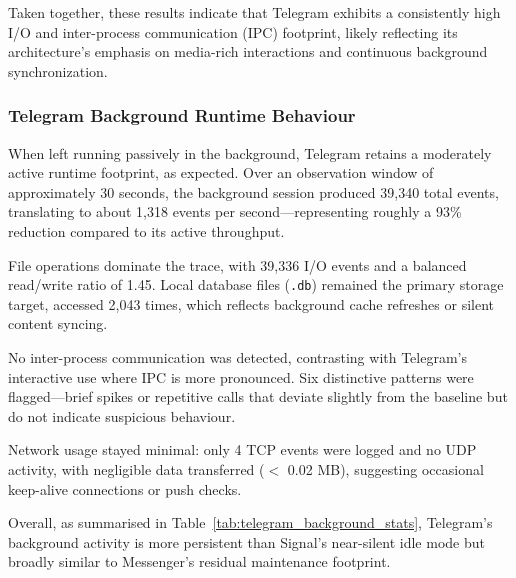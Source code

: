 \documentclass[a4paper,12pt]{report}
\begin{document}
Taken together, these results indicate that Telegram exhibits a consistently high I/O and inter-process communication (IPC) footprint, likely reflecting its architecture’s emphasis on media-rich interactions and continuous background synchronization.
\subsubsection{Telegram Background Runtime Behaviour}

When left running passively in the background, Telegram retains a moderately active runtime footprint, as expected. Over an observation window of approximately 30 seconds, the background session produced 39,340 total events, translating to about 1,318 events per second—representing roughly a 93\% reduction compared to its active throughput.

File operations dominate the trace, with 39,336 I/O events and a balanced read/write ratio of 1.45. Local database files (\texttt{.db}) remained the primary storage target, accessed 2,043 times, which reflects background cache refreshes or silent content syncing.

No inter-process communication was detected, contrasting with Telegram’s interactive use where IPC is more pronounced. Six distinctive patterns were flagged—brief spikes or repetitive calls that deviate slightly from the baseline but do not indicate suspicious behaviour.

Network usage stayed minimal: only 4 TCP events were logged and no UDP activity, with negligible data transferred ($<$ 0.02 MB), suggesting occasional keep-alive connections or push checks.

Overall, as summarised in Table~\ref{tab:telegram_background_stats}, Telegram’s background activity is more persistent than Signal’s near-silent idle mode but broadly similar to Messenger’s residual maintenance footprint.
\end{document}
